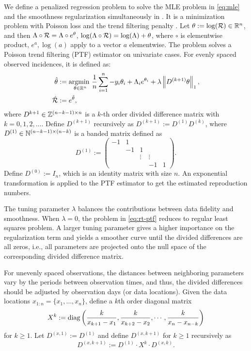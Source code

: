 We define a penalized regression problem to solve the MLE problem in \eqref{eq:mle} and the smoothness regularization simultaneously in \label{eq:rt-ptf}. It is a minimization problem with Poisson loss and the trend filtering penalty \citep{kim2009ell_1,tibshirani2014adaptive}. 
Let $\theta := \log(\mathcal{R}) \in \mathbb{R}^n$, and then $\Lambda\circ \mathcal{R} = \Lambda\circ e^{\theta}$, $\log(\Lambda\circ \mathcal{R}) = \log(\Lambda) + \theta$, where $\circ$ is elementwise product, $e^{a}, \log(a)$ apply to a vector $a$ elementwise. 
The problem solves a Poisson trend filtering (PTF) estimator on univariate cases. For evenly spaced observed incidences, it is defined as: 
\begin{equation} \label{eq:rt-ptf}
    \begin{split}
        \hat{\theta} &:= \underset{\theta\in\mathbb{R}^n}{\operatorname*{argmin}\ } \frac{1}{n}\sum_{i=1}^n -y_i \theta_i + \Lambda_i e^{\theta_i} + \lambda \left\lVert D^{(k+1)} \theta \right\rVert_1, \\
        \hat{\mathcal{R}} &:= e^{\hat{\theta}},
    \end{split}
\end{equation}
where $D^{k+1} \in \mathbb{Z}^{(n-k-1)\times n}$ is a $k$-th order divided difference matrix with $k = 0,1,2,\dots$. Define $D^{(k+1)}$ recursively as $D^{(k+1)} := D^{(1)} D^{(k)}$, where $D^{(1)} \in \mathbb{N}^{(n-k-1)\times (n-k)}$ is a banded matrix defined as
$$D^{(1)} := 
\begin{pmatrix}
-1 & 1 &  & & \\
 & -1 & 1 & & \\
 & & \vdots & \vdots & \\
 & & & -1 & 1
\end{pmatrix}.
$$
Define $D^{(0)} := I_n$, which is an identity matrix with size $n$. An exponential transformation is applied to the PTF estimator to get the estimated reproduction numbers. 

The tuning parameter $\lambda$ balances the contributions between data fidelity and smoothness. When $\lambda=0$, the problem in \eqref{eq:rt-ptf} reduces to regular least squares problem. A larger tuning parameter gives a higher importance on the regularization term and yields a smoother curve until the divided differences are all zeros, i.e., all parameters are projected onto the null space of the corresponding divided difference matrix. 

For unevenly spaced observations, the distances between neighboring parameters vary by the periods between observation times, and thus, the divided differences should be adjusted by observation days (or data locations). Given the data locations $x_{1:n} = \{x_1,\dots,x_n\}$, define a $k$th order diagonal matrix $$X^k := \operatorname*{diag} \left(\frac{k}{x_{k+1} - x_1}, \frac{k}{x_{k+2} - x_2}, \cdots, \frac{k}{x_n - x_{n-k}} \right)$$ for $k \geq 1$. Let $D^{(x,1)} := D^{(1)}$ and define $D^{(x,k+1)}$ for $k\geq 1$ recursively as $$D^{(x,k+1)} := D^{(1)}\cdot X^k \cdot D^{(x,k)}.$$ 

